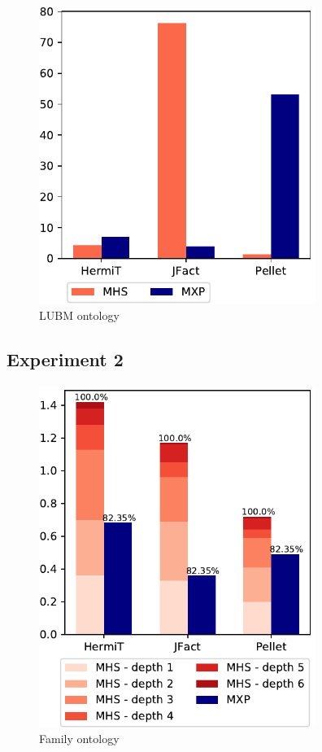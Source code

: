 \documentclass[12pt,a4paper]{article}
\begin{document}
\begin{figure}[H]
	\centering
	\includegraphics[width=9cm]{eval1LUBM} 
	\caption{LUBM ontology}
	\label{fig:eval1LUBM}
\end{figure}

\subsection{Experiment 2}

\begin{figure}[H]
	\centering
	\includegraphics[width=9cm]{eval2Family} 	
	\caption{Family ontology}
	\label{fig:eval2Family}
\end{figure}
\end{document}
